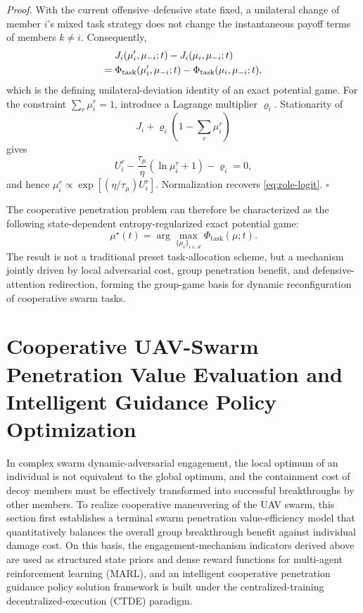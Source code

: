 \documentclass{cja}
\begin{document}
\noindent\textit{Proof.} With the current offensive--defensive state fixed, a unilateral change of member $i$'s mixed task strategy does not change the instantaneous payoff terms of members $k\ne i$. Consequently,
\begin{align}
&J_i(\mu_i',\mu_{-i};t)-J_i(\mu_i,\mu_{-i};t)\notag\\
={}&\Phi_{\mathrm{task}}(\mu_i',\mu_{-i};t)
-\Phi_{\mathrm{task}}(\mu_i,\mu_{-i};t),
\end{align}
which is the defining unilateral-deviation identity of an exact potential game. For the constraint $\sum_r\mu_i^r=1$, introduce a Lagrange multiplier $\varrho_i$. Stationarity of
\begin{equation*}
J_i+\varrho_i\left(1-\sum_r\mu_i^r\right)
\end{equation*}
gives
\begin{equation*}
U_i^r-\frac{\tau_\mu}{\eta}\left(\ln\mu_i^r+1\right)-\varrho_i=0,
\end{equation*}
and hence $\mu_i^r\propto\exp[(\eta/\tau_\mu)U_i^r]$. Normalization recovers \eqref{eq:role-logit}. \hfill$\square$

The cooperative penetration problem can therefore be characterized as the following state-dependent entropy-regularized exact potential game:
\begin{equation}
\mu^{\star}(t)
=
\arg\max_{\{\mu_i\}_{i\in\mathcal{A}}}
\Phi_{\mathrm{task}}(\mu;t).
\end{equation}
The result is not a traditional preset task-allocation scheme, but a mechanism jointly driven by local adversarial cost, group penetration benefit, and defensive-attention redirection, forming the group-game basis for dynamic reconfiguration of cooperative swarm tasks.

\section{Cooperative UAV-Swarm Penetration Value Evaluation and Intelligent Guidance Policy Optimization}

In complex swarm dynamic-adversarial engagement, the local optimum of an individual is not equivalent to the global optimum, and the containment cost of decoy members must be effectively transformed into successful breakthroughs by other members.
To realize cooperative maneuvering of the UAV swarm, this section first establishes a terminal swarm penetration value-efficiency model that quantitatively balances the overall group breakthrough benefit against individual damage cost. On this basis, the engagement-mechanism indicators derived above are used as structured state priors and dense reward functions for multi-agent reinforcement learning (MARL), and an intelligent cooperative penetration guidance policy solution framework is built under the centralized-training decentralized-execution (CTDE) paradigm.
\end{document}
